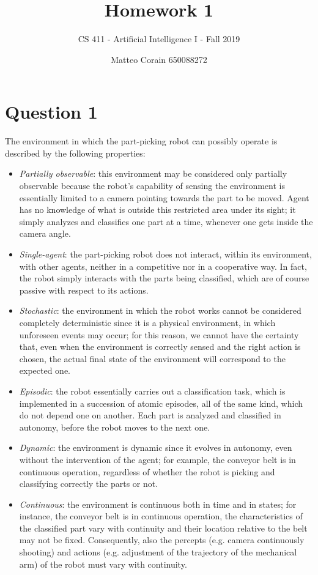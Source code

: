 \documentclass[letterpaper,headings=standardclasses]{scrartcl}
\title{Homework 1}
\subtitle{CS 411 - Artificial Intelligence I - Fall 2019}
\author{Matteo Corain 650088272}
\begin{document}
\maketitle

\section{Question 1}

The environment in which the part-picking robot can possibly operate is described by the following properties:

\begin{itemize}

\item \emph{Partially observable}: this environment may be considered only partially observable because the robot's capability of sensing the environment is essentially limited to a camera pointing towards the part to be moved. Agent has no knowledge of what is outside this restricted area under its sight; it simply analyzes and classifies one part at a time, whenever one gets inside the camera angle.

\item \emph{Single-agent}: the part-picking robot does not interact, within its environment, with other agents, neither in a competitive nor in a cooperative way. In fact, the robot simply interacts with the parts being classified, which are of course passive with respect to its actions.

\item \emph{Stochastic}: the environment in which the robot works cannot be considered completely deterministic since it is a physical environment, in which unforeseen events may occur; for this reason, we cannot have the certainty that, even when the environment is correctly sensed and the right action is chosen, the actual final state of the environment will correspond to the expected one.

\item \emph{Episodic}: the robot essentially carries out a classification task, which is implemented in a succession of atomic episodes, all of the same kind, which do not depend one on another. Each part is analyzed and classified in autonomy, before the robot moves to the next one.

\item \emph{Dynamic}: the environment is dynamic since it evolves in autonomy, even without the intervention of the agent; for example, the conveyor belt is in continuous operation, regardless of whether the robot is picking and classifying correctly the parts or not.

\item \emph{Continuous}: the environment is continuous both in time and in states; for instance, the conveyor belt is in continuous operation, the characteristics of the classified part vary with continuity and their location relative to the belt may not be fixed. Consequently, also the percepts (e.g. camera continuously shooting) and actions (e.g. adjustment of the trajectory of the mechanical arm) of the robot must vary with continuity.

\end{itemize}
\end{document}
